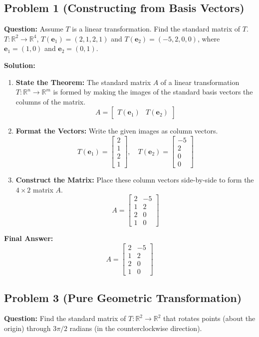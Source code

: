 \documentclass[11pt]{article}
\begin{document}
\subsection*{Problem 1 (Constructing from Basis Vectors)}
\textbf{Question:} Assume $T$ is a linear transformation. Find the standard matrix of $T$. 
$T : \mathbb{R}^2 \to \mathbb{R}^4$, $T(\mathbf{e}_1) = (2, 1, 2, 1)$ and $T(\mathbf{e}_2) = (-5, 2, 0, 0)$, where $\mathbf{e}_1 = (1, 0)$ and $\mathbf{e}_2 = (0, 1)$.

\textbf{Solution:}
\begin{enumerate}
    \item \textbf{State the Theorem:} The standard matrix $A$ of a linear transformation $T: \mathbb{R}^n \to \mathbb{R}^m$ is formed by making the images of the standard basis vectors the columns of the matrix.
    \[ A = \begin{bmatrix} T(\mathbf{e}_1) & T(\mathbf{e}_2) \end{bmatrix} \]
    \item \textbf{Format the Vectors:} Write the given images as column vectors.
    \[ T(\mathbf{e}_1) = \begin{bmatrix} 2 \\ 1 \\ 2 \\ 1 \end{bmatrix}, \quad T(\mathbf{e}_2) = \begin{bmatrix} -5 \\ 2 \\ 0 \\ 0 \end{bmatrix} \]
    \item \textbf{Construct the Matrix:} Place these column vectors side-by-side to form the $4 \times 2$ matrix $A$.
    \[ A = \begin{bmatrix} 2 & -5 \\ 1 & 2 \\ 2 & 0 \\ 1 & 0 \end{bmatrix} \]
\end{enumerate}
\textbf{Final Answer:} \[ A = \begin{bmatrix} 2 & -5 \\ 1 & 2 \\ 2 & 0 \\ 1 & 0 \end{bmatrix} \]

\subsection*{Problem 3 (Pure Geometric Transformation)}
\textbf{Question:} Find the standard matrix of $T: \mathbb{R}^2 \to \mathbb{R}^2$ that rotates points (about the origin) through $3\pi/2$ radians (in the counterclockwise direction).
\end{document}
